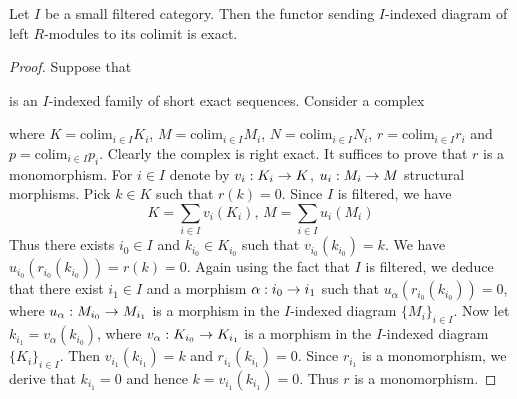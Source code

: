 \begin{proposition}\label{proposition:filteredexact}
Let $I$ be a small filtered category. Then the functor sending $I$-indexed diagram of left $R$-modules to its colimit is exact.
\end{proposition}
\begin{proof}
Suppose that 
\begin{center}
\end{center}
is an $I$-indexed family of short exact sequences. Consider a complex
\begin{center}
\end{center}
where $K=\mathrm{colim}_{i\in I}K_i$, $M=\mathrm{colim}_{i\in I}M_i$, $N=\mathrm{colim}_{i\in I}N_i$, $r=\mathrm{colim}_{i\in I}r_i$ and $p=\mathrm{colim}_{i\in I}p_i$. Clearly the complex is right exact. It suffices to prove that $r$ is a monomorphism. For $i\in I$ denote by $v_i:K_i\rightarrow K$, $u_i:M_i\rightarrow M$ structural morphisms. Pick $k\in K$ such that $r(k)=0$. Since $I$ is filtered, we have
$$K=\sum_{i\in I}v_i(K_i),\,M=\sum_{i\in I}u_i(M_i)$$
Thus there exists $i_0\in I$ and $k_{i_0}\in K_{i_0}$ such that $v_{i_0}(k_{i_0})=k$. We have $u_{i_0}\left(r_{i_0}(k_{i_0})\right)=r(k)=0$. Again using the fact that $I$ is filtered, we deduce that there exist $i_1\in I$ and a morphism $\alpha:i_0\rightarrow i_1$ such that $u_{\alpha}\left(r_{i_0}(k_{i_0})\right)=0$, where $u_{\alpha}:M_{i_0}\rightarrow M_{i_1}$ is a morphism in the $I$-indexed diagram $\{M_i\}_{i\in I}$. Now let $k_{i_1}=v_{\alpha}(k_{i_0})$, where $v_{\alpha}:K_{i_0}\rightarrow K_{i_1}$ is a morphism in the $I$-indexed diagram $\{K_i\}_{i\in I}$. Then $v_{i_1}(k_{i_1})=k$ and $r_{i_1}(k_{i_1})=0$. Since $r_{i_1}$ is a monomorphism, we derive that $k_{i_1}=0$ and hence $k=v_{i_1}(k_{i_1})=0$. Thus $r$ is a monomorphism.
\end{proof}

